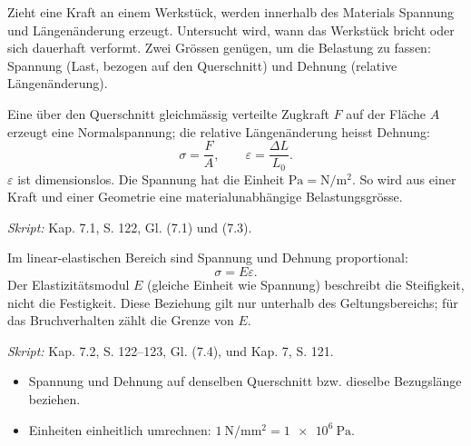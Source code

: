 
Zieht eine Kraft an einem Werkstück, werden innerhalb des Materials Spannung
und Längenänderung erzeugt. Untersucht wird, wann das Werkstück bricht oder
sich dauerhaft verformt. Zwei Grössen genügen, um die Belastung zu fassen:
Spannung (Last, bezogen auf den Querschnitt) und Dehnung (relative
Längenänderung).

\begin{werkzeugkasten}
Eine über den Querschnitt gleichmässig verteilte Zugkraft $F$ auf der Fläche
$A$ erzeugt eine Normalspannung; die relative Längenänderung heisst Dehnung:
\begin{equation}
  \sigma=\frac{F}{A}, \qquad
  \varepsilon=\frac{\Delta L}{L_0}.
\end{equation}
$\varepsilon$ ist dimensionslos. Die Spannung hat die Einheit
$\si{\pascal}=\si{\newton\per\metre\squared}$. So wird aus einer Kraft und
einer Geometrie eine materialunabhängige Belastungsgrösse.

\textit{Skript:} Kap. 7.1, S. 122, Gl. (7.1) und (7.3).
\end{werkzeugkasten}

\begin{werkzeugkasten}
Im linear-elastischen Bereich sind Spannung und Dehnung proportional:
\begin{equation}
  \sigma=E\varepsilon .
\end{equation}
Der Elastizitätsmodul $E$ (gleiche Einheit wie Spannung) beschreibt die
Steifigkeit, nicht die Festigkeit. Diese Beziehung gilt nur unterhalb des
Geltungsbereichs; für das Bruchverhalten zählt die Grenze von $E$.

\textit{Skript:} Kap. 7.2, S. 122--123, Gl. (7.4), und Kap. 7, S. 121.
\end{werkzeugkasten}

\begin{achtung}
\begin{itemize}
  \item Spannung und Dehnung auf denselben Querschnitt bzw. dieselbe
        Bezugslänge beziehen.
  \item Einheiten einheitlich umrechnen: $\qty{1}{\newton\per\milli\metre\squared}
        =\qty{1e6}{\pascal}$.
\end{itemize}
\end{achtung}

